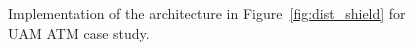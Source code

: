 

\begin{figure}
    \centering
    \scalebox{0.75}{

}
        \caption{Implementation of the architecture in Figure~\ref{fig:dist_shield} for UAM ATM case study. }
	    \label{fig:exp_shield}
    \end{figure}



